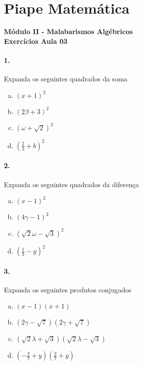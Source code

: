 \documentclass[a4paper,12pt]{article}
\begin{document}
 
  
\section*{Piape Matemática} 
\textbf{Módulo II - Malabarismos Algébricos}\\
\textbf{Exercícios Aula 03}         
\begin{multicols}{2}
\paragraph{1.} Expanda os seguintes quadrados da soma
\begin{enumerate}[a)]
\item $(x + 1)^2$
\item $(2\beta + 3)^2$
\item $(\omega + \sqrt{2})^2$
\item $\displaystyle\left(\frac{2}{3} + b\right)^2$
\end{enumerate} 

\paragraph{2.} Expanda os seguintes quadrados da diferença
\begin{enumerate}[a)]
\item $(x - 1)^2$
\item $(4\gamma - 1)^2$
\item $(\sqrt{2}\omega - \sqrt{3})^2$
\item $\displaystyle\left(\frac{1}{3} - y\right)^2$
\end{enumerate} 

\paragraph{3.} Expanda os seguintes produtos conjugados
\begin{enumerate}[a)]
\item $(x - 1)(x + 1)$
\item $\left(2\gamma - \sqrt{7}\right)\left(2\gamma + \sqrt{7}\right)$
\item $\left(\sqrt{2}\lambda + \sqrt{3}\right)\left(\sqrt{2}\lambda - \sqrt{3}\right)$
\item $\displaystyle\left(-\frac{2}{7} + y\right)\left(\frac{2}{7} + y\right)$
\end{enumerate}  

\end{multicols}
\end{document}
